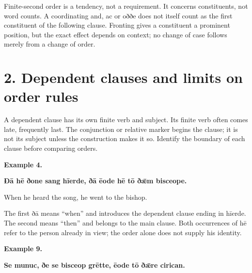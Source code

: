 Finite-second order is a tendency, not a requirement. It concerns constituents, not word counts. A coordinating and, ac or oððe does not itself count as the first constituent of the following clause. Fronting gives a constituent a prominent position, but the exact effect depends on context; no change of case follows merely from a change of order.

\section*{2. Dependent clauses and limits on order rules}

A dependent clause has its own finite verb and subject. Its finite verb often comes late, frequently last. The conjunction or relative marker begins the clause; it is not its subject unless the construction makes it so. Identify the boundary of each clause before comparing orders.

\textbf{Example 4.}

\textbf{Ðā hē ðone sang hīerde, ðā ēode hē tō ðǣm bisceope.}

When he heard the song, he went to the bishop.

The first ðā means “when” and introduces the dependent clause ending in hīerde. The second means “then” and belongs to the main clause. Both occurrences of hē refer to the person already in view; the order alone does not supply his identity.

\textbf{Example 9.}

\textbf{Se munuc, ðe se bisceop grētte, ēode tō ðǣre cirican.}

